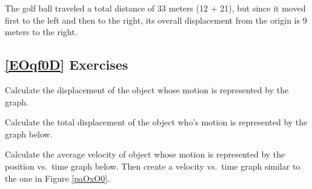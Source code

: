 \documentclass[main.tex]{subfiles}
\begin{document}
The golf ball traveled a total distance of 33 meters (12 + 21), but since it moved first to the left and then to the right, its overall displacement from the origin is 9 meters to the right.

\solutionEnd

\subsection*{\ref{EOqf0D} Exercises}

\begin{exercise} \label{E3dHaa}
    Calculate the displacement of the object whose motion is represented by the graph.
\end{exercise}

\begin{center}
\end{center}

\begin{exercise} \label{1xi7hi}
    Calculate the total displacement of the object who's motion is represented by the graph below.
\end{exercise}

\begin{center}
\end{center}

\begin{exercise}
    Calculate the average velocity of object whose motion is represented by the position vs.~time graph below. Then create a velocity vs.~time graph similar to the one in Figure \ref{paOxO0}.
\end{exercise}
\end{document}
